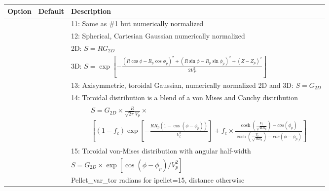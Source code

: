 \begin{tabular}{llp{4.5in}}
  \textbf{Option}&\textbf{Default}&\textbf{Description}\\
  \hline
        &  & 11: Same as \#1 but numerically normalized \\
        &  & 12: Spherical, Cartesian Gaussian numerically normalized \\
        &  & 2D: $ S = R G_{2D} $ \\
        &  & 3D: $ S = \exp \left[ - \frac{(R\cos\phi - R_p\cos\phi_p)^2 
                                          +(R\sin\phi - R_p\sin\phi_p)^2
                                          +(Z - Z_p)^2}{2 V_P^2} \right] $ \\
        &  & 13: Axisymmetric, toroidal Gaussian, numerically normalized 2D and 3D:
                 $S = G_{2D} $ \\
        &  & 14: Toroidal distribution is a blend of a von Mises and Cauchy distribution \\
        &  &     \begin{equation}
                 \begin{aligned}  
              &  S = G_{2D}\times \frac{R}{\sqrt{2 \pi} V_p} \times \nonumber \\
              &  \left[ (1 - f_c) \exp \left[  - \frac {R R_p \left( 1 - \cos(\phi-\phi_p) \right)}{V_t^2} \right] 
                       + f_c \times \frac{\cosh(\frac{V_t}{\sqrt{RR_p}}) - cos(\phi_p)}
                                             {\cosh(\frac{V_t}{\sqrt{RR_p}}) - cos(\phi - \phi_p)} \right]
                   \nonumber \end{aligned} 
                   \end{equation} \\


        &  & 15: Toroidal von-Mises distribution with angular half-width \\
        &  & $ S = G_{2D} \times \exp \left[ \cos(\phi - \phi_p) / V_p^2                   
                                      \right] $ \\
        &  & Pellet\_var\_tor radians for ipellet=15, distance otherwise \\


\end{tabular}
